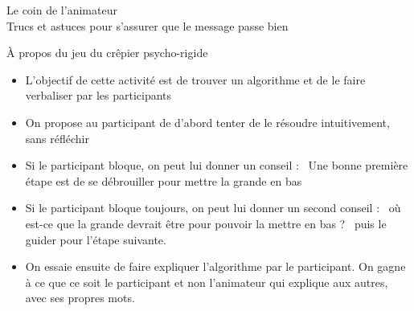 \documentclass[final,hyperref={pdfpagelabels=false}]{beamer}
\renewcommand*{\large}{\fontsize{\resultlargeX}{\resultlargeY}\selectfont}
\begin{document}
\begin{frame}{Le coin de l'animateur\\[-5pt]
  {\large Trucs et astuces pour s'assurer que le message passe bien}}
  \begin{block}{À propos du jeu du crêpier psycho-rigide}
    \begin{itemize}
    \item L'objectif de cette activité est de trouver un algorithme et de
    le faire verbaliser par les participants
    \item On propose au participant de d'abord tenter de le résoudre
    intuitivement, sans réfléchir
    \item Si le participant bloque, on peut lui donner un conseil : \og~Une
    bonne première étape est de se débrouiller pour mettre la grande en bas~\fg
    \item Si le participant bloque toujours, on peut lui donner un second
    conseil : \og~où est-ce que la grande devrait être pour pouvoir la mettre en
    bas ? ~\fg puis le guider pour l'étape suivante.
    \item On essaie ensuite de faire expliquer l'algorithme par le participant.
    On gagne à ce que ce soit le participant et non l'animateur qui explique aux
    autres, avec ses propres mots.
    \end{itemize}
  \end{block}
\end{frame}
\end{document}
